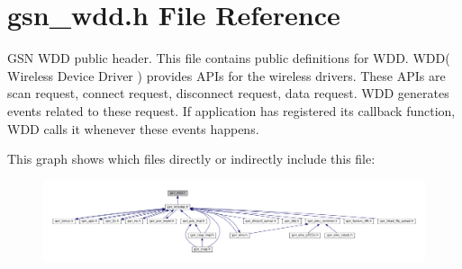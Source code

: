 \hypertarget{a00603}{
\section{gsn\_\-wdd.h File Reference}
\label{a00603}
}


GSN WDD public header. This file contains public definitions for WDD. WDD( Wireless Device Driver ) provides APIs for the wireless drivers. These APIs are scan request, connect request, disconnect request, data request. WDD generates events related to these request. If application has registered its callback function, WDD calls it whenever these events happens.  


This graph shows which files directly or indirectly include this file:
\nopagebreak
\begin{figure}[H]
\begin{center}
\leavevmode
\includegraphics[width=400pt]{a00849}
\end{center}
\end{figure}
